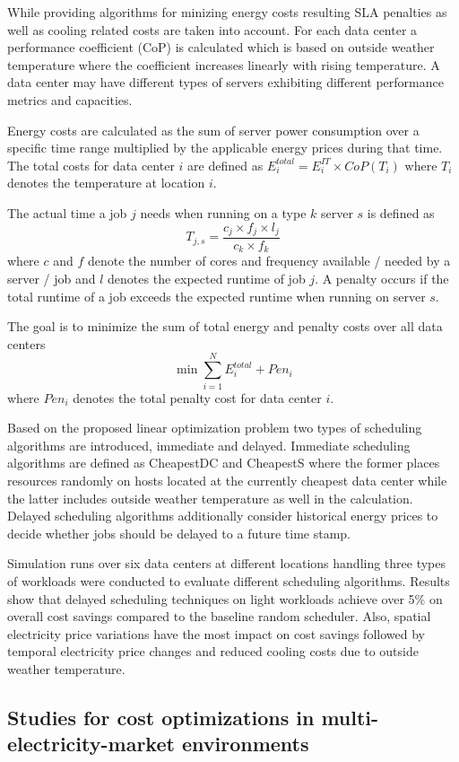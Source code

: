 While providing algorithms for minizing energy costs resulting SLA penalties as well as cooling related costs are taken into account. 
For each data center a performance coefficient (CoP) is calculated which is based on outside weather temperature where the coefficient increases linearly with rising temperature. A data center may have different types of servers exhibiting different performance metrics and capacities. 

Energy costs are calculated as the sum of server power consumption over a specific time range multiplied by the applicable energy prices during that time. 
The total costs for data center $i$ are defined as $E_{i}^{total} = E_{i}^{IT} \times CoP(T_i)$ where $T_i$ denotes the temperature at location $i$. 

The actual time a job $j$ needs when running on a type $k$ server $s$ is defined as 
\[  T_{j,s} = \frac{c_j \times f_j \times l_j}{c_k \times f_k}  \] 
where $c$ and $f$ denote the number of cores and frequency available / needed by a server / job and $l$ denotes the expected runtime of job $j$. 
A penalty occurs if the total runtime of a job exceeds the expected runtime when running on server $s$. 

The goal is to minimize the sum of total energy and penalty costs over all data centers 
\[ \min \sum_{i=1}^{N}{E_{i}^{total} + Pen_i} \]
where $Pen_i$ denotes the total penalty cost for data center $i$. 

Based on the proposed linear optimization problem two types of scheduling algorithms are introduced, immediate and delayed. Immediate scheduling algorithms are defined as CheapestDC and CheapestS where the former places resources randomly on hosts located at the currently cheapest data center while the latter includes outside weather temperature as well in the calculation. Delayed scheduling algorithms additionally consider historical energy prices to decide whether jobs should be delayed to a future time stamp. 

Simulation runs over six data centers at different locations handling three types of workloads were conducted to evaluate different scheduling algorithms.
Results show that delayed scheduling techniques on light workloads achieve over 5\% on overall cost savings compared to the baseline random scheduler. Also, spatial electricity price variations have the most impact on cost savings followed by temporal electricity price changes and reduced cooling costs due to outside weather temperature. 


\subsection{Studies for cost optimizations in multi-electricity-market environments}

